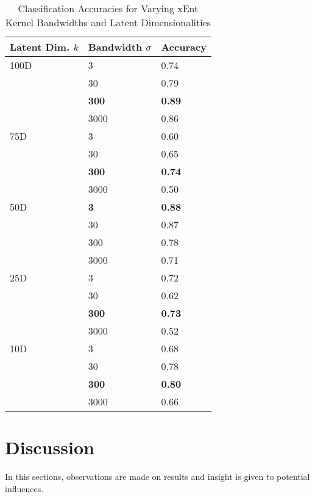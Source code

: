\documentclass[conference]{IEEEtran}
\begin{document}
\begin{table}[h!]
	\caption{Classification Accuracies for Varying xEnt Kernel Bandwidths and Latent Dimensionalities}
	\label{tab:bw_comparison}
	\normalsize
	\begin{tabularx}{\columnwidth}{ |X|X|X| } 
		\hline
		\textbf{Latent Dim. $k$}  & \textbf{Bandwidth $\sigma$} & \textbf{Accuracy} \\
		\hline
		100D & 3 & 0.74\\
		\hline
		 & 30 & 0.79\\
		\hline
		 & \textbf{300} & \textbf{0.89}\\
		\hline
		 & 3000 & 0.86\\
		\hline
		75D & 3 & 0.60\\
		\hline
		 & 30 & 0.65\\
		\hline
		 & \textbf{300} & \textbf{0.74}\\
		\hline
		 & 3000 & 0.50\\
		\hline
		50D & \textbf{3} & \textbf{0.88}\\
		\hline
		 & 30 & 0.87\\
		\hline
		 & 300 & 0.78\\
		\hline
		 & 3000 & 0.71\\
		 \hline
		25D & 3 & 0.72\\
		\hline
		& 30 & 0.62\\
		\hline
		& \textbf{300} & \textbf{0.73}\\
		\hline
		& 3000 & 0.52\\
		\hline
		10D & 3 & 0.68\\
		\hline
		& 30 & 0.78\\
		\hline
		& \textbf{300} & \textbf{0.80}\\
		\hline
		& 3000 & 0.66\\
		\hline
	\end{tabularx}
\end{table} 







\section{Discussion} \label{Discussion}
In this sections, observations are made on results and insight is given to potential influences.
\end{document}
